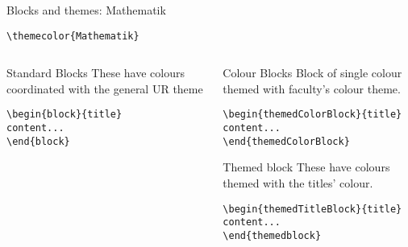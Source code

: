 \begingroup
{}
\begin{frame}[fragile]{Blocks and themes: Mathematik}
    \begin{center}\verb|\themecolor{Mathematik}|\end{center}
\begin{columns} %
\begin{column}{0.3\textwidth}
\begin{block}{Standard Blocks}
These have colours coordinated with the general UR theme
\begin{verbatim}
\begin{block}{title}
content...
\end{block}
\end{verbatim}
\end{block}
\end{column}
\begin{column}{0.7\textwidth}
\begin{themedColorBlock}{Colour Blocks}
Block of single colour themed with faculty's colour theme.
\small
\begin{verbatim}
\begin{themedColorBlock}{title}
content...
\end{themedColorBlock}
\end{verbatim}
\end{themedColorBlock}
\begin{themedTitleBlock} {Themed block}
These have colours themed with the titles' colour.
\small
\begin{verbatim}
\begin{themedTitleBlock}{title}
content...
\end{themedblock}
\end{verbatim}
\end{themedTitleBlock}
\end{column}
\end{columns}
\end{frame}
\endgroup


